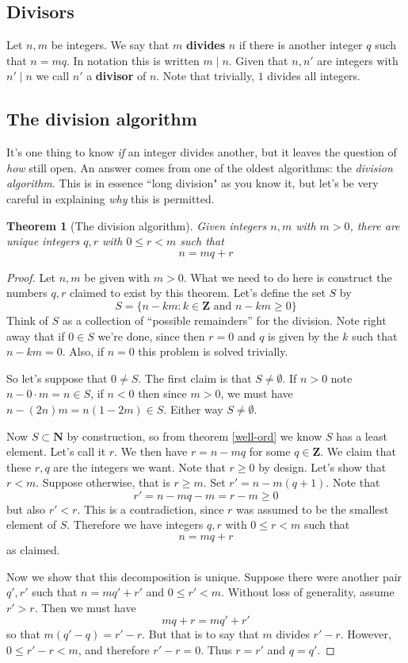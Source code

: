 \documentclass[12pt]{article}
\numberwithin{equation}{subsection}
\newtheorem{thm}[subsection]{Theorem}
\theoremstyle{note}
\begin{document}
\subsection{Divisors}
Let $n,m$ be integers. We say that $m$ \textbf{divides} $n$ if there is another integer $q$ such that $n=mq$. In notation this is written $m \mid n$. Given that $n,n'$ are integers with $n'\mid n$ we call $n'$ a \textbf{divisor} of $n$. Note that trivially, $1$ divides all integers. 

\subsection{The division algorithm}

It's one thing to know \textit{if} an integer divides another, but it leaves the question of \textit{how} still open. An answer comes from one of the oldest algorithms: the \textit{division algorithm}. This is in essence ``long division" as you know it, but let's be very careful in explaining \textit{why} this is permitted.

\begin{thm}[The division algorithm] \label{div-alg}
	Given integers $n,m$ with $m>0$, there are unique integers $q,r$ with $0\leq r< m$ such that \[ n = mq+r\]
\end{thm}

\begin{proof}
	Let $n,m$ be given with $m>0$. What we need to do here is construct the numbers $q,r$ claimed to exist by this theorem. Let's define the set $S$ by \[ S= \{n-km : k\in \mathbf{Z} \text{ and } n-km\geq 0\}\] Think of $S$ as a collection of ``possible remainders'' for the division. Note right away that if $0\in{S}$ we're done, since then $r=0$ and $q$ is given by the $k$ such that $n-km=0$. Also, if $n=0$ this problem is solved trivially. 
	
	So let's suppose that $0\neq S$. The first claim is that $S\neq \emptyset$. If $n>0$ note $n-0\cdot m =n\in S$, if $n<0$ then since $m>0$, we must have $n-(2n)m=n(1-2m)\in S$. Either way $S\neq \emptyset$. 
	
	Now $S\subset \mathbf{N}$ by construction, so from theorem \ref{well-ord} we know $S$ has a least element. Let's call it $r$. We then have $r=n-mq$ for some $q\in \mathbf{Z}$. We claim that these $r,q$ are the integers we want. Note that $r\geq 0$ by design. Let's show that $r<m$. Suppose otherwise, that is $r\geq m$. Set $r'=n-m(q+1)$. Note that \[ r'=n-mq-m=r-m\geq 0\] but also $r'<r$. This is a contradiction, since $r$ was assumed to be the smallest element of $S$. Therefore we have integers $q,r$ with $0\leq r<m$ such that  \[ n=mq+r\] as claimed.
	
	Now we show that this decomposition is unique. Suppose there were another pair $q',r'$ such that $n=mq'+r'$ and $0\leq r' < m$. Without loss of generality, assume $r'>r$. Then we must have \[ mq+r=mq'+r'\] so that $m(q'-q)=r'-r$. But that is to say that $m$ divides $r'-r$. However, $0\leq r'-r< m$, and therefore $r'-r=0$. Thus $r=r'$ and $q=q'$.
\end{proof}
\end{document}
